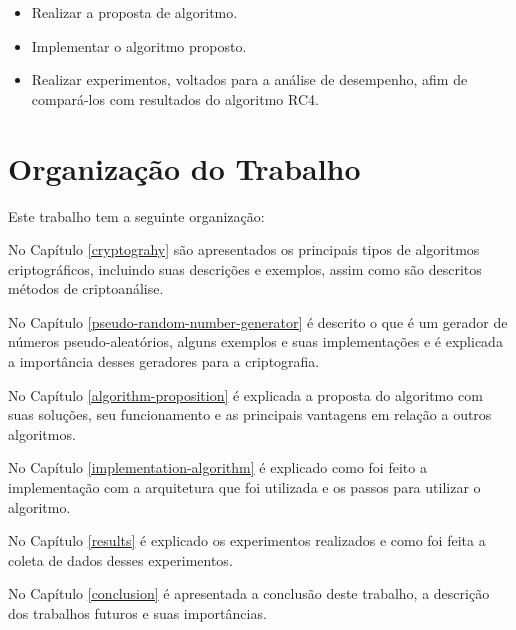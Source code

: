 \begin{itemize}
	\item Realizar a proposta de algoritmo.
	\item Implementar o algoritmo proposto.
	\item Realizar experimentos, voltados para a análise de desempenho, afim de compará-los com resultados do algoritmo RC4.
\end{itemize}

\section{Organização do Trabalho}
\label{paper-organization}

Este trabalho tem a seguinte organização:

No Capítulo \ref{cryptograhy} são apresentados os principais tipos de algoritmos criptográficos, incluindo suas descrições e exemplos, assim como são descritos métodos de criptoanálise.

No Capítulo \ref{pseudo-random-number-generator} é descrito o que é um gerador de números pseudo-aleatórios, alguns exemplos e suas implementações e é explicada a importância desses geradores para a criptografia. 

No Capítulo \ref{algorithm-proposition} é explicada a proposta do algoritmo com suas soluções, seu funcionamento e as principais vantagens em relação a outros algoritmos.

No Capítulo \ref{implementation-algorithm} é explicado como foi feito a implementação com a arquitetura que foi utilizada e os passos para utilizar o algoritmo.

No Capítulo \ref{results} é explicado os experimentos realizados e como foi feita a coleta de dados desses experimentos. 

No Capítulo \ref{conclusion} é apresentada a conclusão deste trabalho, a descrição dos trabalhos futuros e suas importâncias.
